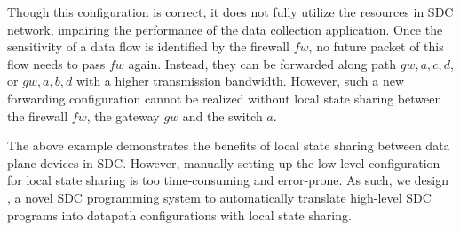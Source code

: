 Though this configuration is correct, it does not fully utilize the resources in
SDC network, impairing the performance of the data collection application. Once
the sensitivity of a data flow is identified by the firewall $fw$, no future
packet of this flow needs to pass $fw$ again. Instead, they can be forwarded along path $gw, a, c, d $, or $gw, a, b, d$ with a higher transmission bandwidth. However, such a new
forwarding configuration cannot be realized without local state sharing between
the firewall $fw$, the gateway $gw$ and the switch $a$.

The above example demonstrates the benefits of local state sharing between data
plane devices in SDC. However, manually setting up the low-level configuration
for local state sharing is too time-consuming and error-prone. As such, we
design \concept, a novel SDC programming system to automatically translate
high-level SDC programs into datapath configurations with local state
sharing.









